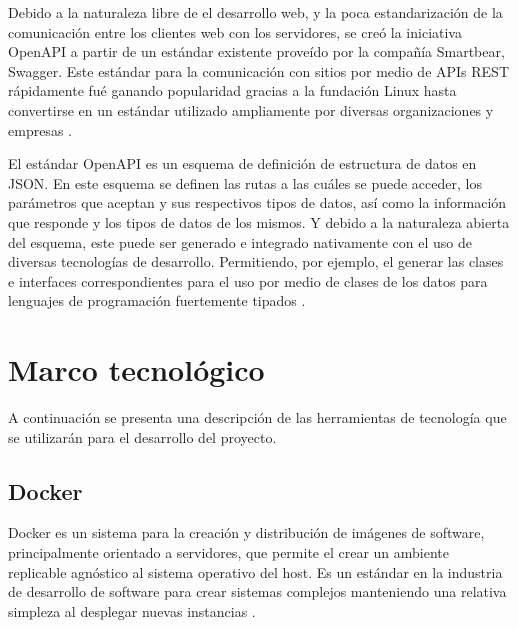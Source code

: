Debido a la naturaleza libre de el desarrollo web, y la poca estandarización de la comunicación entre los clientes web con los servidores, se creó la iniciativa OpenAPI a partir de un estándar existente proveído por la compañía Smartbear, Swagger. Este estándar para la comunicación con sitios por medio de APIs REST rápidamente fué ganando popularidad gracias a la fundación Linux hasta convertirse en un estándar utilizado ampliamente por diversas organizaciones y empresas \cite{OpenAPI_foundation}.

El estándar OpenAPI es un esquema de definición de estructura de datos en JSON. En este esquema se definen las rutas a las cuáles se puede acceder, los parámetros que aceptan y sus respectivos tipos de datos, así como la información que responde y los tipos de datos de los mismos. Y debido a la naturaleza abierta del esquema, este puede ser generado e integrado nativamente con el uso de diversas tecnologías de desarrollo. Permitiendo, por ejemplo, el generar las clases e interfaces correspondientes para el uso por medio de clases de los datos para lenguajes de programación fuertemente tipados \cite{openapi_generator}.


\section{Marco tecnológico}



A continuación se presenta una descripción de las herramientas de tecnología que se utilizarán para el desarrollo del proyecto.

\subsection{Docker}

Docker es un sistema para la creación y distribución de imágenes de software, principalmente orientado a servidores, que permite el crear un ambiente replicable agnóstico al sistema operativo del host. Es un estándar en la industria de desarrollo de software para crear sistemas complejos manteniendo una relativa simpleza al desplegar nuevas instancias \cite{rad2017dockerAnalysis}.


